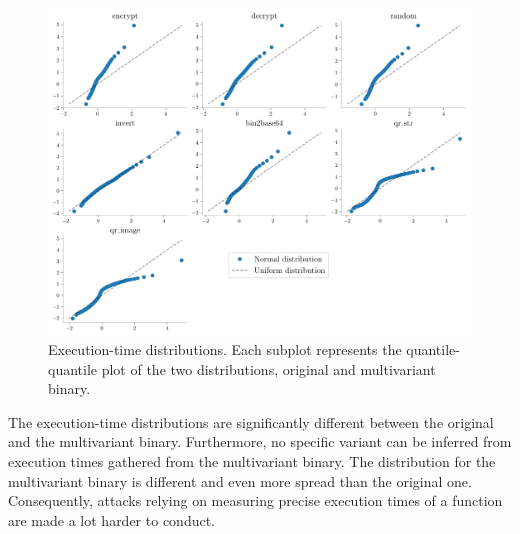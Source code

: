 \begin{figure}[h]
    \includegraphics[width=\linewidth]{plots/qqplots.pdf}
    \caption{Execution-time distributions. Each subplot represents the quantile-quantile plot of the two distributions, original and multivariant binary. }
    \label{rq3:diversity:times}
\end{figure}



\begin{tcolorbox}[title=Answer to RQ3.,boxrule=2pt,arc=.3em,boxsep=1.5mm]
    
The execution-time distributions are significantly different between the original and the multivariant binary. Furthermore, no specific variant can be inferred from execution times gathered from the multivariant binary. 
The distribution for the multivariant binary is different and even more spread than the original one.
Consequently, attacks relying on measuring precise execution times \cite{morgan2015web} of a function are made a lot harder to conduct. 

\end{tcolorbox}
